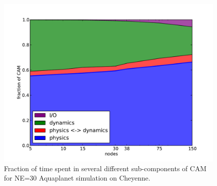\begin{figure}[h]
\centering
 \includegraphics[scale=0.45]{figs/percent}
 \caption{Fraction of time spent in several different sub-components of CAM for NE=30 Aquaplanet simulation on Cheyenne.}
 \label{fig:percent}
\end{figure}


